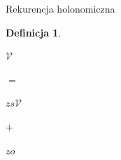 \documentclass[final]{beamer}
\theoremstyle{bluetheorem}
\theoremstyle{bluetheorem}
\newtheorem{mydefinition}[mytheorem]{Definicja}
\theoremstyle{greentheorem}
\newcommand{\gf}[1]{\ensuremath{\mathcal{#1}}}
\begin{document}
\begin{frame}{Rekurencja holonomiczna}
\begin{mydefinition}
        \begin{center}
            \begin{minipage}[t]{.2\textwidth}
                \begin{center}
                    \(\gf{V}\)\\
                \end{center}
            \end{minipage}%
            \begin{minipage}[t]{.05\textwidth}
                \begin{center}
                    \(=\)\\
                \end{center}
            \end{minipage}%
            \begin{minipage}[t]{.2\textwidth}
                \begin{center}
                    \(z s \gf{V}\)\\
                \end{center}
            \end{minipage}%
            \begin{minipage}[t]{.05\textwidth}
                \begin{center}
                    \(+\)\\
                \end{center}
            \end{minipage}%
            \begin{minipage}[t]{.2\textwidth}
                \begin{center}
                    \(z o\)\\
                \end{center}
            \end{minipage}%
        \end{center}
    \end{mydefinition}
\end{frame}
\end{document}
